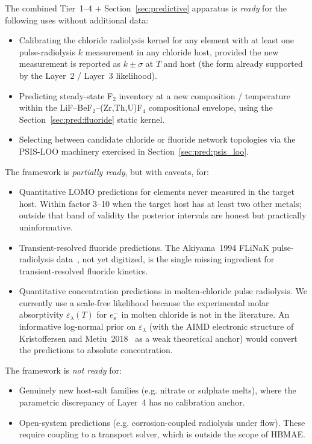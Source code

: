 \documentclass[12pt]{article}
\theoremstyle{plain}
\theoremstyle{definition}
\theoremstyle{remark}
\newcommand{\eS}{\ensuremath{e_{\mathrm{s}}^{-}}\xspace}
\newcommand{\HBMAE}{HBMAE\xspace}
\begin{document}
The combined Tier~1--4 + Section~\ref{sec:predictive} apparatus is
\emph{ready} for the following uses without additional data:
\begin{itemize}
  \item Calibrating the chloride radiolysis kernel for any element with at
        least one pulse-radiolysis $k$ measurement in any chloride host,
        provided the new measurement is reported as $k\pm\sigma$ at $T$ and
        host (the form already supported by the Layer~2 / Layer~3 likelihood).
  \item Predicting steady-state F$_2$ inventory at a new
        composition / temperature within the LiF--BeF$_2$--(Zr,Th,U)F$_4$
        compositional envelope, using the
        Section~\ref{sec:pred:fluoride} static kernel.
  \item Selecting between candidate chloride or fluoride network
        topologies via the PSIS-LOO machinery exercised in
        Section~\ref{sec:pred:psis_loo}.
\end{itemize}
%
The framework is \emph{partially ready}, but with caveats, for:
\begin{itemize}
  \item Quantitative LOMO predictions for elements never measured in the
        target host.  Within factor 3--10 when the target host has at
        least two other metals;  outside that band of validity the
        posterior intervals are honest but practically uninformative.
  \item Transient-resolved fluoride predictions.  The Akiyama~1994
        FLiNaK pulse-radiolysis data~\citep{Akiyama1994}, not yet
        digitized, is the single missing ingredient for transient-resolved
        fluoride kinetics.
  \item Quantitative concentration predictions in molten-chloride pulse
        radiolysis.  We currently use a scale-free likelihood because the
        experimental molar absorptivity $\varepsilon_\lambda(T)$ for
        $\eS$ in molten chloride is not in the literature.  An informative
        log-normal prior on $\varepsilon_\lambda$ (with the AIMD electronic
        structure of Kristoffersen and Metiu~2018~\citep{KristoffersenMetiu2018}
        as a weak theoretical anchor) would convert the predictions to
        absolute concentration.
\end{itemize}
%
The framework is \emph{not ready} for:
\begin{itemize}
  \item Genuinely new host-salt families (e.g. nitrate or sulphate melts),
        where the parametric discrepancy of Layer~4 has no calibration
        anchor.
  \item Open-system predictions (e.g. corrosion-coupled radiolysis under
        flow).  These require coupling to a transport solver, which is
        outside the scope of \HBMAE.
\end{itemize}
\end{document}
